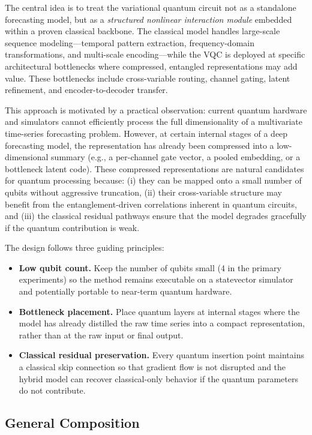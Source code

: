 \documentclass[11pt]{article}
\begin{document}
The central idea is to treat the variational quantum circuit not as a standalone forecasting model, but as a \emph{structured nonlinear interaction module} embedded within a proven classical backbone. The classical model handles large-scale sequence modeling---temporal pattern extraction, frequency-domain transformations, and multi-scale encoding---while the VQC is deployed at specific architectural bottlenecks where compressed, entangled representations may add value. These bottlenecks include cross-variable routing, channel gating, latent refinement, and encoder-to-decoder transfer.

This approach is motivated by a practical observation: current quantum hardware and simulators cannot efficiently process the full dimensionality of a multivariate time-series forecasting problem. However, at certain internal stages of a deep forecasting model, the representation has already been compressed into a low-dimensional summary (e.g., a per-channel gate vector, a pooled embedding, or a bottleneck latent code). These compressed representations are natural candidates for quantum processing because: (i) they can be mapped onto a small number of qubits without aggressive truncation, (ii) their cross-variable structure may benefit from the entanglement-driven correlations inherent in quantum circuits, and (iii) the classical residual pathways ensure that the model degrades gracefully if the quantum contribution is weak.

The design follows three guiding principles:
\begin{itemize}
  \item \textbf{Low qubit count.} Keep the number of qubits small (4 in the primary experiments) so the method remains executable on a statevector simulator and potentially portable to near-term quantum hardware.
  \item \textbf{Bottleneck placement.} Place quantum layers at internal stages where the model has already distilled the raw time series into a compact representation, rather than at the raw input or final output.
  \item \textbf{Classical residual preservation.} Every quantum insertion point maintains a classical skip connection so that gradient flow is not disrupted and the hybrid model can recover classical-only behavior if the quantum parameters do not contribute.
\end{itemize}

\subsection{General Composition}
\end{document}
